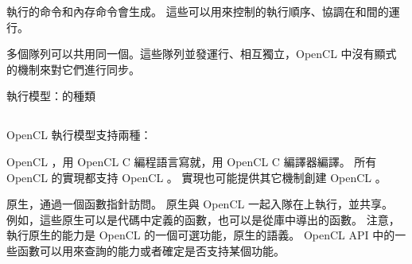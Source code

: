 執行的命令和內存命令會生成。
這些可以用來控制的執行順序、協調在和間的運行。

多個隊列可以共用同一個。這些隊列並發運行、相互獨立，OpenCL 中沒有顯式的機制來對它們進行同步。

\startbuffer[buftitleexecmck]
執行模型：的種類
\stopbuffer
\subsection{\getbuffer[buftitleexecmck]}
OpenCL 執行模型支持兩種：
\startigBase
\item {\ftEmpha OpenCL }，用 OpenCL C 編程語言寫就，用 OpenCL C 編譯器編譯。
所有 OpenCL 的實現都支持 OpenCL 。
實現也可能提供其它機制創建 OpenCL 。

\item {\ftEmpha 原生}，通過一個函數指針訪問。
原生與 OpenCL 一起入隊在上執行，並共享。
例如，這些原生可以是代碼中定義的函數，也可以是從庫中導出的函數。
注意，執行原生的能力是 OpenCL 的一個可選功能，原生的語義。
OpenCL API 中的一些函數可以用來查詢的能力或者確定是否支持某個功能。
\stopigBase

